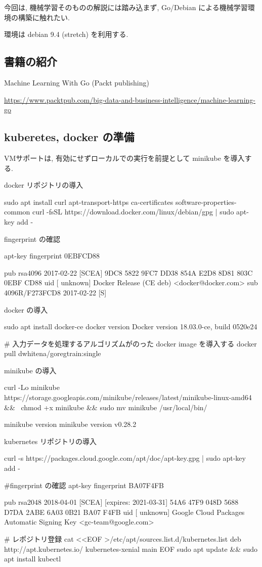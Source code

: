 \documentclass[mingoth,a4paper]{jsarticle}
\begin{document}
今回は, 機械学習そのものの解説には踏み込まず, Go/Debian による機械学習環境の構築に触れたい.

環境は debian 9.4 (stretch) を利用する.

\subsection{書籍の紹介}
Machine Learning With Go (Packt publishing)

\url{https://www.packtpub.com/big-data-and-business-intelligence/machine-learning-go}

\subsection{kuberetes, docker の準備}
VMサポートは, 有効にせずローカルでの実行を前提として minikube を導入する.

docker リポジトリの導入
\begin{commandline}
sudo apt install curl apt-transport-https ca-certificates software-properties-common
curl -fsSL https://download.docker.com/linux/debian/gpg | sudo apt-key add -
\end{commandline}

fingerprint の確認
\begin{commandline}
apt-key fingerprint 0EBFCD88

pub   rsa4096 2017-02-22 [SCEA]
      9DC8 5822 9FC7 DD38 854A  E2D8 8D81 803C 0EBF CD88
uid           [ unknown] Docker Release (CE deb) <docker@docker.com>
sub   4096R/F273FCD8 2017-02-22 [S]
\end{commandline}

docker の導入
\begin{commandline}
sudo apt install docker-ce
docker version
Docker version 18.03.0-ce, build 0520e24

# 入力データを処理するアルゴリズムがのった docker image を導入する
docker pull dwhitena/goregtrain:single
\end{commandline}


minikube の導入
\begin{commandline}
curl -Lo minikube https://storage.googleapis.com/minikube/releases/latest/minikube-linux-amd64 && \
chmod +x minikube && sudo mv minikube /usr/local/bin/

minikube version
minikube version v0.28.2
\end{commandline}

kubernetes リポジトリの導入
\begin{commandline}
curl -s https://packages.cloud.google.com/apt/doc/apt-key.gpg | sudo apt-key add -

#fingerprint の確認
apt-key fingerprint BA07F4FB

pub   rsa2048 2018-04-01 [SCEA] [expires: 2021-03-31]
      54A6 47F9 048D 5688 D7DA  2ABE 6A03 0B21 BA07 F4FB
uid           [ unknown] Google Cloud Packages Automatic Signing Key <gc-team@google.com>

# レポジトリ登録
cat <<EOF >/etc/apt/sources.list.d/kubernetes.list
deb http://apt.kubernetes.io/ kubernetes-xenial main
EOF
sudo apt update && sudo apt install kubectl
\end{commandline}
\end{document}
